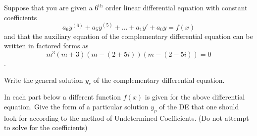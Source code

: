 \documentclass[exam=2]{math252exam}
\begin{document}
\begin{problems}
{\begin{equation*}
	\end{equation*}}
	\problem Suppose that you are given a $6^{\mbox{th}}$ order linear differential equation with constant coefficients \[ a_{6}y^{(6)} + a_{5}y^{(5)} + \dots + a_{1}y' + a_{0}y = f(x) \] and that the auxiliary equation of the complementary differential equation can be written in factored forms as \[ m^{3}(m+3)(m-(2+5i))(m-(2-5i)) = 0 \].
	\begin{problems}
		\subproblem Write the general solution $y_{c}$ of the complementary differential equation. 
	\end{problems}
	In each part below a different function $f(x)$ is given for the above differential equation. Give the form of a particular solution $y_{p}$ of the DE that one should look for according to the method of Undetermined Coefficients. (Do not attempt to solve for the coefficients)

\end{problems}
\end{document}
